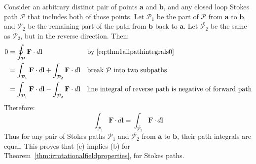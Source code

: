 \documentclass[a4paper]{article}
\theoremstyle{plain}
\theoremstyle{definition}
\newcommand{\vect}[1]{\textbf{#1}}
\begin{document}
Consider an arbitrary distinct pair of points $\vect{a}$ and
$\vect{b}$, and any closed loop Stokes path $\mathcal{P}$ that
includes both of those points.  Let $\mathcal{P}_1$ be the part of
$\mathcal{P}$ from $\vect{a}$ to $\vect{b}$, and $\mathcal{P}_2$ be
the remaining part of the path from $\vect{b}$ back to $\vect{a}$.
Let $\bar{\mathcal{P}_2}$ be the same as $\mathcal{P}_2$, but in the
reverse direction.  Then:
\begin{align}
  0
      & = \oint_{\mathcal{P}} \vect{F} \cdot d\vect{l} & & \text{by~\eqref{eq:thm1allpathintegrals0}} \nonumber \\
      & = \int_{\mathcal{P}_1} \vect{F} \cdot d\vect{l} + \int_{\mathcal{P}_2} \vect{F} \cdot d\vect{l} & & \text{break $\mathcal{P}$ into two subpaths} \nonumber \\
      & = \int_{\mathcal{P}_1} \vect{F} \cdot d\vect{l} - \int_{\bar{\mathcal{P}_2}} \vect{F} \cdot d\vect{l} & & \text{line integral of reverse path is negative of forward path} \nonumber
\end{align}
Therefore:
\begin{equation}
\int_{\mathcal{P}_1} \vect{F} \cdot d\vect{l} = \int_{\bar{\mathcal{P}_2}} \vect{F} \cdot d\vect{l}
\end{equation}
Thus for any pair of Stokes paths $\mathcal{P}_1$ and
$\bar{\mathcal{P}_2}$ from $\vect{a}$ to $\vect{b}$, their path
integrals are equal.
This proves that (c) implies (b) for
Theorem~\ref{thm:irrotationalfieldproperties}, for Stokes paths.
\end{document}
